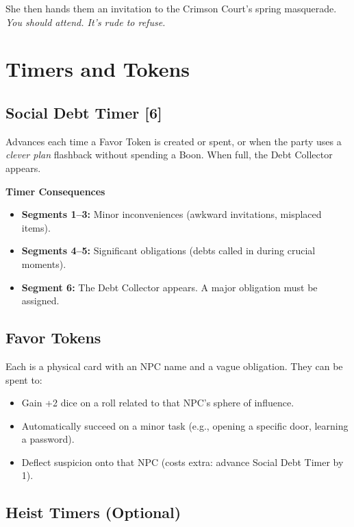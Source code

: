 \documentclass[12pt]{book}
\begin{document}
She then hands them an invitation to the Crimson Court's spring masquerade. \textit{You should attend. It's rude to refuse.}

\chapter{Timers and Tokens}

\section{Social Debt Timer [6]}

Advances each time a Favor Token is created or spent, or when the party uses a \textit{clever plan} flashback without spending a Boon. When full, the Debt Collector appears.

\begin{infobox}
\textbf{Timer Consequences}
\begin{itemize}
    \item \textbf{Segments 1--3:} Minor inconveniences (awkward invitations, misplaced items).
    \item \textbf{Segments 4--5:} Significant obligations (debts called in during crucial moments).
    \item \textbf{Segment 6:} The Debt Collector appears. A major obligation must be assigned.
\end{itemize}
\end{infobox}

\section{Favor Tokens}

Each is a physical card with an NPC name and a vague obligation. They can be spent to:
\begin{itemize}
    \item Gain +2 dice on a roll related to that NPC's sphere of influence.
    \item Automatically succeed on a minor task (e.g., opening a specific door, learning a password).
    \item Deflect suspicion onto that NPC (costs extra: advance Social Debt Timer by 1).
\end{itemize}

\section{Heist Timers (Optional)}
\end{document}
